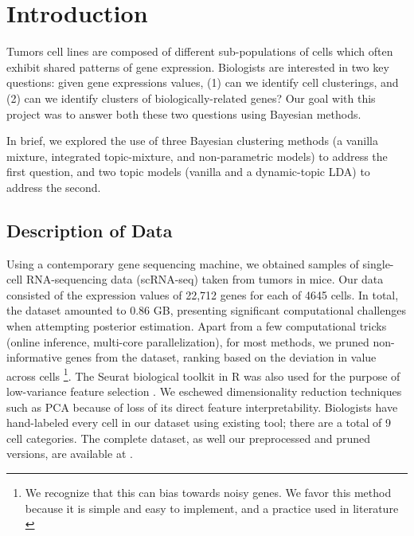 \documentclass{article}
\begin{document}
 


\section{Introduction}
\label{intro}
Tumors cell lines are composed of different sub-populations of cells which often exhibit shared patterns of gene expression. Biologists are interested in two key questions: given gene expressions values, (1) can we identify cell clusterings, and (2) can we identify clusters of biologically-related genes? Our goal with this project was to answer both these two questions using Bayesian methods.

In brief, we explored the use of three Bayesian clustering methods (a vanilla mixture, integrated topic-mixture, and non-parametric models) to address the first question, and two topic models (vanilla and a dynamic-topic LDA) to address the second. 

\subsection{Description of Data}
Using a contemporary gene sequencing machine, we obtained samples of single-cell RNA-sequencing data (scRNA-seq) taken from tumors in mice. Our data consisted of the expression values of 22,712 genes for each of 4645 cells. In total, the dataset amounted to 0.86 GB, presenting significant computational challenges when attempting posterior estimation. Apart from a few computational tricks (online inference, multi-core parallelization), for most methods, we pruned non-informative genes from the dataset, ranking based on the deviation in value across cells \footnote{We recognize that this can bias towards noisy genes. We favor this method because it is simple and easy to implement, and a practice used in literature \cite{pruning}}. The Seurat biological toolkit in R was also used for the purpose of low-variance feature selection \cite{seurat}. We eschewed dimensionality reduction techniques such as PCA because of loss of its direct feature interpretability. Biologists have hand-labeled every cell in our dataset using existing tool; there are a total of 9 cell categories. The complete dataset, as well our preprocessed and pruned versions, are available at \cite{dataset}.
\end{document}
